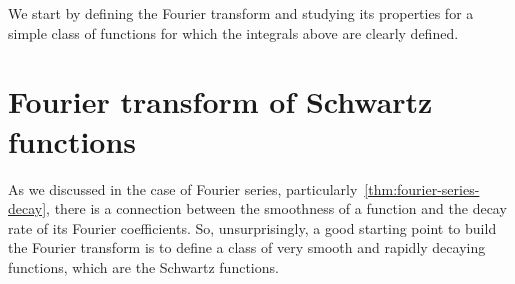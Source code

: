 We start by defining the Fourier transform and studying its properties for a simple class
of functions for which the integrals above are clearly defined.
\section{Fourier transform of Schwartz functions}
As we discussed in the case of Fourier series,
particularly~\cref{thm:fourier-series-decay}, there is a connection between the smoothness
of a function and the decay rate of its Fourier coefficients. So, unsurprisingly, a good
starting point to build the Fourier transform is to define a class of very smooth and
rapidly decaying functions, which are the Schwartz functions.
